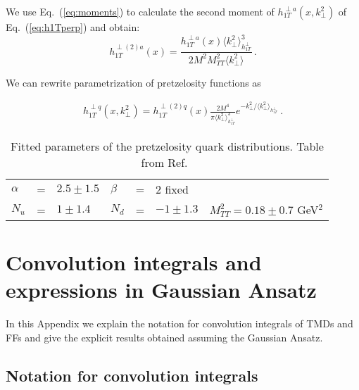 \documentclass[a4paper,11pt]{article}
\newcommand{\be}{\begin{equation}}
\newcommand{\ee}{\end{equation}}
\newcommand{\ba}{\begin{eqnarray}}
\newcommand{\ea}{\end{eqnarray}}
\newcommand{\la}{\langle}
\newcommand{\ra}{\rangle}
\def\kperp{k_\perp}
\def\avkperp{\la \kperp^2 \ra}
\begin{document}
  We use Eq.~(\ref{eq:moments}) to calculate the second moment of $ h_{1T}^{\perp a}(x,\kperp^2)$
of Eq.~(\ref{eq:h1Tperp}) and obtain:
\be
h_{1T}^{\perp (2) a}(x) =  \frac{h^{\perp a}_{1T}(x) \avkperp_{h_{1T}^\perp}^3}{2 M^2 M_{TT}^2 \avkperp} \, .
\ee

We can rewrite parametrization of pretzelosity   functions as

\ba
h_{1T}^{\perp q}(x,\kperp^2) =  h_{1T}^{\perp (2) q}(x)   \frac{2 M^4}{\pi \avkperp_{h_{1T}^\perp}^3} e^{-\kperp^2/{\avkperp_{h_{1T}^\perp}}}
\label{pretzelosity_new} \ .
\ea

%
\begin{table}[htb]
\centering
\begin{tabular}{l c l l c l l}
\hline
$\alpha$ &=& $2.5\pm1.5$ & $\beta$ &=& $2$ fixed \\
 $N_{u}$ &=& $1 \pm 1.4$ & $N_{d}$ &=& $-1 \pm 1.3$ &
 $M_{TT}^2=0.18 \pm  0.7$ GeV$^2$\\ 
\hline
\end{tabular}
\caption{Fitted parameters of the pretzelosity quark distributions. Table from Ref.~\cite{Lefky:2014eia}}
\label{fitparI}
\end{table}
%
 

\section{Convolution integrals and expressions in Gaussian Ansatz}
\label{App:factor}

In this Appendix we explain the notation for convolution integrals
of TMDs and FFs and give the explicit results obtained assuming the
Gaussian Ansatz.

\subsection{Notation for convolution integrals \label{ApendixB1}}
 
\end{document}
